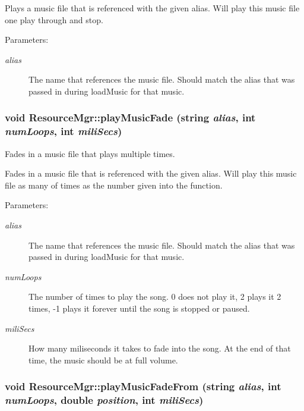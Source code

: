 Plays a music file that is referenced with the given alias. Will play this music file one play through and stop. \begin{Desc}
\item[Parameters:]
\begin{description}
\item[{\em alias}]The name that references the music file. Should match the alias that was passed in during loadMusic for that music. \end{description}
\end{Desc}
\hypertarget{class_resource_mgr_3202543d74c502aeb3bd1990f1137236}{
\subsubsection[{playMusicFade}]{\setlength{\rightskip}{0pt plus 5cm}void ResourceMgr::playMusicFade (string {\em alias}, \/  int {\em numLoops}, \/  int {\em miliSecs})}}
\label{class_resource_mgr_3202543d74c502aeb3bd1990f1137236}


Fades in a music file that plays multiple times. 

Fades in a music file that is referenced with the given alias. Will play this music file as many of times as the number given into the function. \begin{Desc}
\item[Parameters:]
\begin{description}
\item[{\em alias}]The name that references the music file. Should match the alias that was passed in during loadMusic for that music. \item[{\em numLoops}]The number of times to play the song. 0 does not play it, 2 plays it 2 times, -1 plays it forever until the song is stopped or paused. \item[{\em miliSecs}]How many miliseconds it takes to fade into the song. At the end of that time, the music should be at full volume. \end{description}
\end{Desc}
\hypertarget{class_resource_mgr_ccdc08e8b11c17fb10ed93b7d51e45b0}{
\subsubsection[{playMusicFadeFrom}]{\setlength{\rightskip}{0pt plus 5cm}void ResourceMgr::playMusicFadeFrom (string {\em alias}, \/  int {\em numLoops}, \/  double {\em position}, \/  int {\em miliSecs})}}
\label{class_resource_mgr_ccdc08e8b11c17fb10ed93b7d51e45b0}


